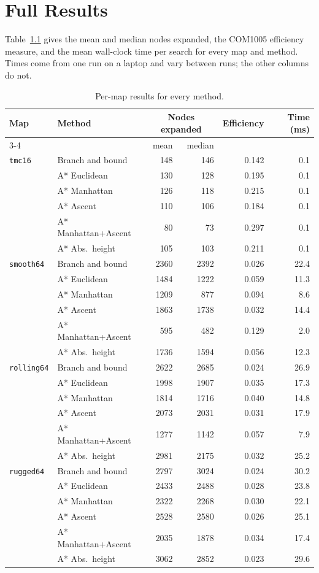 \chapter{Full Results}
\label{app:full}

Table~\ref{tab:full} gives the mean and median nodes expanded, the COM1005 efficiency measure, and the mean wall-clock time per search for every map and method. Times come from one run on a laptop and vary between runs; the other columns do not.

\begin{table}[ht]
\centering
\caption{Per-map results for every method.}
\label{tab:full}
\small
\begin{tabular}{llrrrr}
\toprule
Map & Method & \multicolumn{2}{c}{Nodes expanded} & Efficiency & Time (ms) \\
\cmidrule(lr){3-4}
 & & mean & median & & \\
\midrule
\texttt{tmc16} & Branch and bound & 148 & 146 & 0.142 & 0.1 \\
 & A* Euclidean & 130 & 128 & 0.195 & 0.1 \\
 & A* Manhattan & 126 & 118 & 0.215 & 0.1 \\
 & A* Ascent & 110 & 106 & 0.184 & 0.1 \\
 & A* Manhattan+Ascent & 80 & 73 & 0.297 & 0.1 \\
 & A* Abs.\ height & 105 & 103 & 0.211 & 0.1 \\
\midrule
\texttt{smooth64} & Branch and bound & 2360 & 2392 & 0.026 & 22.4 \\
 & A* Euclidean & 1484 & 1222 & 0.059 & 11.3 \\
 & A* Manhattan & 1209 & 877 & 0.094 & 8.6 \\
 & A* Ascent & 1863 & 1738 & 0.032 & 14.4 \\
 & A* Manhattan+Ascent & 595 & 482 & 0.129 & 2.0 \\
 & A* Abs.\ height & 1736 & 1594 & 0.056 & 12.3 \\
\midrule
\texttt{rolling64} & Branch and bound & 2622 & 2685 & 0.024 & 26.9 \\
 & A* Euclidean & 1998 & 1907 & 0.035 & 17.3 \\
 & A* Manhattan & 1814 & 1716 & 0.040 & 14.8 \\
 & A* Ascent & 2073 & 2031 & 0.031 & 17.9 \\
 & A* Manhattan+Ascent & 1277 & 1142 & 0.057 & 7.9 \\
 & A* Abs.\ height & 2981 & 2175 & 0.032 & 25.2 \\
\midrule
\texttt{rugged64} & Branch and bound & 2797 & 3024 & 0.024 & 30.2 \\
 & A* Euclidean & 2433 & 2488 & 0.028 & 23.8 \\
 & A* Manhattan & 2322 & 2268 & 0.030 & 22.1 \\
 & A* Ascent & 2528 & 2580 & 0.026 & 25.1 \\
 & A* Manhattan+Ascent & 2035 & 1878 & 0.034 & 17.4 \\
 & A* Abs.\ height & 3062 & 2852 & 0.023 & 29.6 \\
\bottomrule
\end{tabular}
\end{table}
